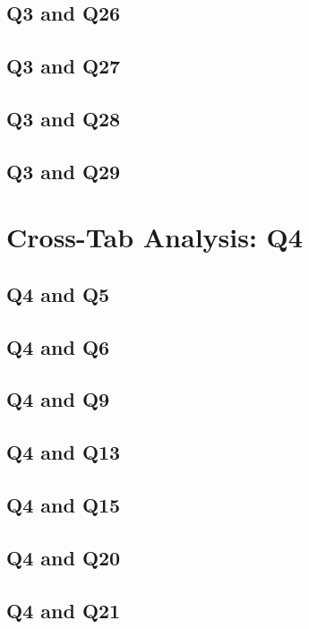 \documentclass{report}
\begin{document}
\section{Q3 and Q26}\clearpage
\section{Q3 and Q27}\clearpage
\section{Q3 and Q28}\clearpage
\section{Q3 and Q29}\clearpage

\chapter{Cross-Tab Analysis: Q4}

\section{Q4 and Q5}\clearpage
\section{Q4 and Q6}\clearpage
\section{Q4 and Q9}\clearpage
\section{Q4 and Q13}\clearpage
\section{Q4 and Q15}\clearpage
\section{Q4 and Q20}\clearpage
\section{Q4 and Q21}\clearpage
\end{document}

